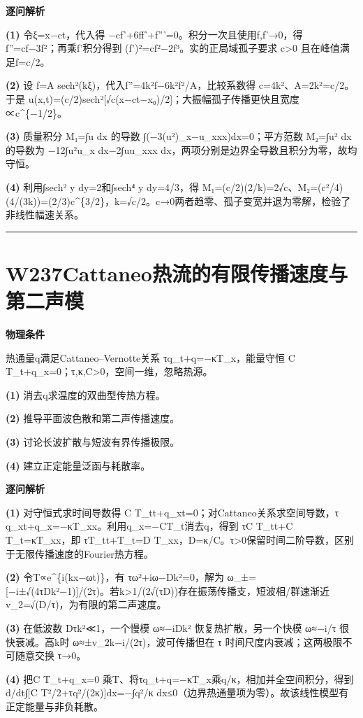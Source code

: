 \documentclass[UTF8,a4paper,11pt,oneside,openany]{ctexbook}
\begin{document}
\par\medskip\noindent\textbf{逐问解析}
\par\noindent\textbf{(1)} 令ξ=x−ct，代入得 −cf'+6ff'+f'''=0。积分一次且使用f,f'→0，得 f''=cf−3f²；再乘f'积分得到 (f')²=cf²−2f³。实的正局域孤子要求 c>0 且在峰值满足f=c/2。
\par\noindent\textbf{(2)} 设 f=A sech²(kξ)，代入f''=4k²f−6k²f²/A，比较系数得 c=4k²、A=2k²=c/2。于是 u(x,t)=(c/2)sech²[√c(x−ct−x₀)/2]；大振幅孤子传播更快且宽度∝c\textasciicircum{}\{−1/2\}。
\par\noindent\textbf{(3)} 质量积分 M₁=∫u dx 的导数 ∫(−3(u²)\_x−u\_xxx)dx=0；平方范数 M₂=∫u² dx 的导数为 −12∫u²u\_x dx−2∫uu\_xxx dx，两项分别是边界全导数且积分为零，故均守恒。
\par\noindent\textbf{(4)} 利用∫sech² y dy=2和∫sech⁴ y dy=4/3，得 M₁=(c/2)(2/k)=2√c、M₂=(c²/4)(4/(3k))=(2/3)c\textasciicircum{}\{3/2\}，k=√c/2。c→0两者趋零、孤子变宽并退为零解，检验了非线性幅速关系。

\par\bigskip\hrule\bigskip
\section*{W237\quad Cattaneo热流的有限传播速度与第二声模}
\textbf{物理条件}\par 热通量q满足Cattaneo–Vernotte关系 τq\_t+q=−κT\_x，能量守恒 C T\_t+q\_x=0；τ,κ,C>0，空间一维，忽略热源。
\par\noindent\textbf{(1)} 消去q求温度的双曲型传热方程。
\par\noindent\textbf{(2)} 推导平面波色散和第二声传播速度。
\par\noindent\textbf{(3)} 讨论长波扩散与短波有界传播极限。
\par\noindent\textbf{(4)} 建立正定能量泛函与耗散率。

\par\medskip\noindent\textbf{逐问解析}
\par\noindent\textbf{(1)} 对守恒式求时间导数得 C T\_tt+q\_xt=0；对Cattaneo关系求空间导数，τ q\_xt+q\_x=−κT\_xx。利用q\_x=−CT\_t消去q，得到 τC T\_tt+C T\_t=κT\_xx，即 τT\_tt+T\_t=D T\_xx，D=κ/C。τ>0保留时间二阶导数，区别于无限传播速度的Fourier热方程。
\par\noindent\textbf{(2)} 令T∝e\textasciicircum{}\{i(kx−ωt)\}，有 τω²+iω−Dk²=0，解为 ω\_±=[−i±√(4τDk²−1)]/(2τ)。若k>1/(2√(τD))存在振荡传播支，短波相/群速渐近 v\_2=√(D/τ)，为有限的第二声速度。
\par\noindent\textbf{(3)} 在低波数 Dτk²≪1，一个慢模 ω≈−iDk² 恢复热扩散，另一个快模 ω≈−i/τ 很快衰减。高k时 ω≈±v\_2k−i/(2τ)，波可传播但在 τ 时间尺度内衰减；这两极限不可随意交换 τ→0。
\par\noindent\textbf{(4)} 把C T\_t+q\_x=0 乘T、将τq\_t+q=−κT\_x乘q/κ，相加并全空间积分，得到 d/dt∫[C T²/2+τq²/(2κ)]dx=−∫q²/κ dx≤0（边界热通量项为零）。故该线性模型有正定能量与非负耗散。
\end{document}
